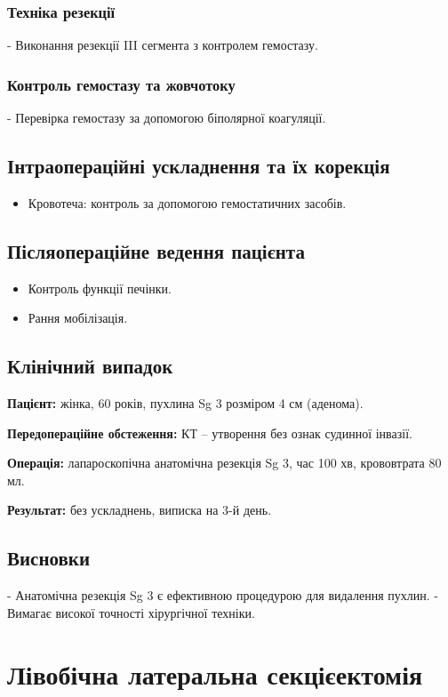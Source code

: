 \begin{refsection}
\subsubsection{Техніка резекції}
- Виконання резекції III сегмента з контролем гемостазу.

\subsubsection{Контроль гемостазу та жовчотоку}
- Перевірка гемостазу за допомогою біполярної коагуляції.

\subsection{Інтраопераційні ускладнення та їх корекція}
\begin{itemize}
    \item Кровотеча: контроль за допомогою гемостатичних засобів.
\end{itemize}

\subsection{Післяопераційне ведення пацієнта}
\begin{itemize}
    \item Контроль функції печінки.
    \item Рання мобілізація.
\end{itemize}

\subsection{Клінічний випадок}
\textbf{Пацієнт:} жінка, 60 років, пухлина Sg 3 розміром 4 см (аденома).

\textbf{Передопераційне обстеження:} КТ – утворення без ознак судинної інвазії.

\textbf{Операція:} лапароскопічна анатомічна резекція Sg 3, час 100 хв, крововтрата 80 мл.

\textbf{Результат:} без ускладнень, виписка на 3-й день.

\subsection{Висновки}
- Анатомічна резекція Sg 3 є ефективною процедурою для видалення пухлин.
- Вимагає високої точності хірургічної техніки.

\section{Лівобічна латеральна секцієектомія}

\end{refsection}
